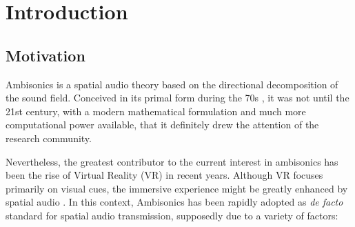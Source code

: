 \chapter{Introduction}

\section{Motivation}

Ambisonics is a spatial audio theory based on the directional decomposition of the sound field. Conceived in its primal form during the 70s \cite{gerzon1973periphony}, it was not until the 21st century, with a modern mathematical formulation \cite{daniel2000representation} and much more computational power available, that it definitely drew the attention of the research community. 



Nevertheless, the greatest contributor to the current interest in ambisonics has been the rise of Virtual Reality (VR) in recent years.
Although VR focuses primarily on visual cues, the immersive experience might be greatly enhanced by spatial audio . In this context, Ambisonics has been rapidly adopted as \textit{de facto} standard for spatial audio transmission, supposedly due to a variety of factors:

